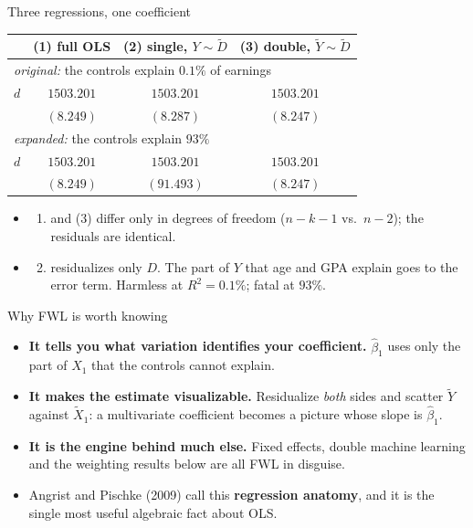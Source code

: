 \documentclass[
  11pt,
  ignorenonframetext,
  aspectratio=169,
]{beamer}
\providecommand{\tightlist}{%
  \setlength{\itemsep}{0pt}\setlength{\parskip}{0pt}}
\begin{document}
\begin{frame}{Three regressions, one coefficient}
\protect{}\label{three-regressions-one-coefficient}
\begin{center}
\footnotesize
\begin{tabular}{lccc}
\toprule
 & (1) full OLS & (2) single, $Y \sim \tilde D$ & (3) double, $\tilde Y \sim \tilde D$ \\
\midrule
\multicolumn{4}{l}{\emph{original:} the controls explain $0.1\%$ of earnings} \\
$d$ & $1503.201$ & $1503.201$ & $1503.201$ \\
    & $(8.249)$  & $(8.287)$  & $(8.247)$ \\
\midrule
\multicolumn{4}{l}{\emph{expanded:} the controls explain $93\%$} \\
$d$ & $1503.201$ & $1503.201$ & $1503.201$ \\
    & $(8.249)$  & $(\mathbf{91.493})$ & $(8.247)$ \\
\bottomrule
\end{tabular}
\end{center}

\begin{itemize}
\tightlist
\item
  \begin{enumerate}
  [(1)]
  \tightlist
  \item
    and (3) differ only in degrees of freedom (\(n-k-1\) vs.~\(n-2\));
    the residuals are identical.
  \end{enumerate}
\item
  \begin{enumerate}
  [(1)]
  \setcounter{enumi}{1}
  \tightlist
  \item
    residualizes only \(D\). The part of \(Y\) that age and GPA explain
    goes to the error term. Harmless at \(R^2 = 0.1\%\); fatal at
    \(93\%\).
  \end{enumerate}
\end{itemize}
\end{frame}

\begin{frame}{Why FWL is worth knowing}
\protect{}\label{why-fwl-is-worth-knowing}
\begin{itemize}
\tightlist
\item
  \textbf{It tells you what variation identifies your coefficient.}
  \(\hat\beta_1\) uses only the part of \(X_1\) that the controls cannot
  explain.
\item
  \textbf{It makes the estimate visualizable.} Residualize \emph{both}
  sides and scatter \(\tilde Y\) against \(\tilde X_1\): a multivariate
  coefficient becomes a picture whose slope is \(\hat\beta_1\).
\item
  \textbf{It is the engine behind much else.} Fixed effects, double
  machine learning and the weighting results below are all FWL in
  disguise.
\item
  Angrist and Pischke (2009) call this \textbf{regression anatomy}, and
  it is the single most useful algebraic fact about OLS.
\end{itemize}
\end{frame}
\end{document}
